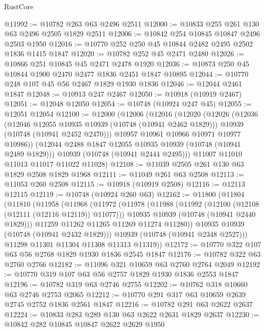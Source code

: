 \begin{lexlean}{RustCore}
\begin{coremodule}
@11992 := @10782 @263 @63 @2496 @2511
@12000 := @10833 @255 @261 @130 @63 @2496 @2505 @1829 @2511
@12006 := @10842 @254 @10845 @10847 @2496 @2503 @1950
@12016 := @10770 @252 @250 @45 @10844 @2482 @2495 @2502 @1836 @1415 @1847
@12020 := @10782 @252 @45 @2471 @2480
@12026 := @10866 @251 @10845 @45 @2471 @2478 @1920
@12036 := @10873 @250 @45 @10844 @1900 @2470 @2477 @1836 @2451 @1847 @10895
@12044 := @10770 @248 @107 @45 @56 @2467 @1829 @1930 @1836
@12046 := @12044 @2461 @1847
@12048 := @10913 @247 @2467
@12050 := @10918 (@10919 @2467)
@12051 := @12048 @12050
@12054 := @10748 (@10924 @247 @45)
@12055 := @12051 @12054
@12100 := @12000
    (@12006
      (@12016
        (@12020
          (@12026
            (@12036
              (@12046 @12055 @10935 @10939 (@10748 (@10941 @2462 @1829)))
              @10939
              (@10748 (@10941 @2452 @2470)))
            @10957
            @10961
            @10966
            @10971
            @10977
            @10986))
        (@12044 @2488 @1847 @12055 @10935 @10939 (@10748 (@10941 @2489 @1829)))
        @10939
        (@10748 (@10941 @2444 @2495)))
      @11007
      @11010
      @11013
      @11017
      @11022
      @11028)
@12108 := @11039 @2505 @261 @130 @63 @1829 @2508 @1829 @1968
@12111 := @11049 @261 @63 @2508
@12113 := @11053 @260 @2508
@12115 := @10918 (@10919 @2508)
@12116 := @12113 @12115
@12119 := @10748 (@10924 @260 @63)
@12162 := @11800
    (@11804
      (@11810
        (@11958
          (@11968
            (@11972
              (@11978
                (@11988
                  (@11992 (@12100 (@12108 (@12111 (@12116 @12119)) @11077)))
                  @10935
                  @10939
                  (@10748 (@10941 @2440 @1829)))
                @11259
                @11262
                @11265
                @11269
                @11274
                @11280))
            @10935
            @10939
            (@10748 (@10941 @2432 @1829)))
          @10939
          (@10748 (@10941 @2348 @2527)))
        @11298
        @11301
        @11304
        @11308
        @11313
        @11319))
@12172 := @10770 @322 @107 @63 @56 @2768 @1829 @1930 @1836 @2545 @1847
@12176 := @10782 @322 @63 @2760 @2766
@12182 := @11096 @321 @10659 @63 @2760 @2764 @2049
@12192 := @10770 @319 @107 @63 @56 @2757 @1829 @1930 @1836 @2553 @1847
@12196 := @10782 @319 @63 @2746 @2755
@12202 := @10762 @318 @10660 @63 @2746 @2753 @2065
@12212 := @10770 @291 @317 @63 @10659 @2639 @2745 @2752 @1836 @2561 @1847
@12216 := @10782 @291 @63 @2622 @2637
@12224 := @10833 @283 @289 @130 @63 @2622 @2631 @1829 @2637
@12230 := @10842 @282 @10845 @10847 @2622 @2629 @1950

\end{coremodule}
\end{lexlean}
